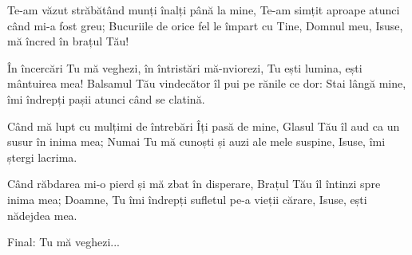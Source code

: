 \beginverse
Te-am văzut străbătând munți înalți până la mine,
Te-am simțit aproape atunci când mi-a fost greu;
Bucuriile de orice fel le împart cu Tine,
Domnul meu, Isuse, mă încred în brațul Tău!
\endverse

\beginchorus
În încercări Tu mă veghezi, în întristări mă-nviorezi,
Tu ești lumina, ești mântuirea mea!
Balsamul Tău vindecător îl pui pe rănile ce dor:
Stai lângă mine, îmi îndrepți pașii atunci când se clatină.
\endchorus

\beginverse
Când mă lupt cu mulțimi de întrebări Îți pasă de mine,
Glasul Tău îl aud ca un susur în inima mea;
Numai Tu mă cunoști și auzi ale mele suspine,
Isuse, îmi ștergi lacrima.
\endverse

\beginverse
Când răbdarea mi-o pierd și mă zbat în disperare,
Brațul Tău îl întinzi spre inima mea;
Doamne, Tu îmi îndrepți sufletul pe-a vieții cărare,
Isuse, ești nădejdea mea.
\endverse

\beginverse*
Final: Tu mă veghezi...
\endverse
\endsong